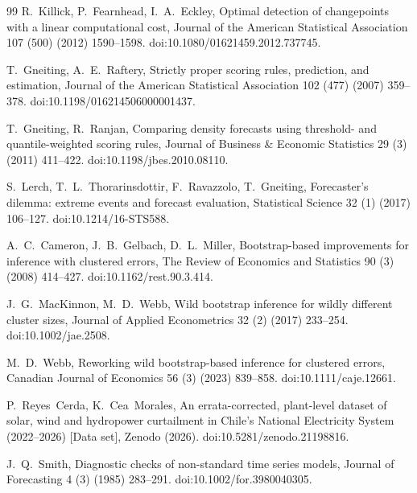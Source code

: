 \begin{thebibliography}{99}
R.~Killick, P.~Fearnhead, I.~A.~Eckley,
Optimal detection of changepoints with a linear computational cost,
Journal of the American Statistical Association 107 (500) (2012) 1590--1598.
doi:10.1080/01621459.2012.737745.

T.~Gneiting, A.~E.~Raftery,
Strictly proper scoring rules, prediction, and estimation,
Journal of the American Statistical Association 102 (477) (2007) 359--378.
doi:10.1198/016214506000001437.

T.~Gneiting, R.~Ranjan,
Comparing density forecasts using threshold- and quantile-weighted scoring rules,
Journal of Business \& Economic Statistics 29 (3) (2011) 411--422.
doi:10.1198/jbes.2010.08110.

S.~Lerch, T.~L.~Thorarinsdottir, F.~Ravazzolo, T.~Gneiting,
Forecaster's dilemma: extreme events and forecast evaluation,
Statistical Science 32 (1) (2017) 106--127.
doi:10.1214/16-STS588.

A.~C.~Cameron, J.~B.~Gelbach, D.~L.~Miller,
Bootstrap-based improvements for inference with clustered errors,
The Review of Economics and Statistics 90 (3) (2008) 414--427.
doi:10.1162/rest.90.3.414.

J.~G.~MacKinnon, M.~D.~Webb,
Wild bootstrap inference for wildly different cluster sizes,
Journal of Applied Econometrics 32 (2) (2017) 233--254.
doi:10.1002/jae.2508.

M.~D.~Webb,
Reworking wild bootstrap-based inference for clustered errors,
Canadian Journal of Economics 56 (3) (2023) 839--858.
doi:10.1111/caje.12661.

P.~Reyes~Cerda, K.~Cea~Morales,
An errata-corrected, plant-level dataset of solar, wind and hydropower curtailment in Chile's National Electricity System (2022--2026) [Data set],
Zenodo (2026). doi:10.5281/zenodo.21198816.

J.~Q.~Smith,
Diagnostic checks of non-standard time series models,
Journal of Forecasting 4 (3) (1985) 283--291.
doi:10.1002/for.3980040305.

\end{thebibliography}
